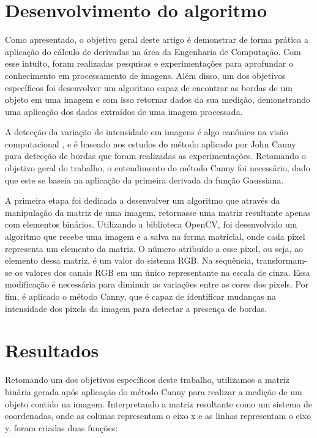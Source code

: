 \documentclass[a4paper,alpha-refs]{RBCA_v1.0}
\begin{document}
\section{Desenvolvimento do algoritmo}

Como apresentado, o objetivo geral deste artigo é demonstrar de forma prática a aplicação do cálculo de derivadas na área da Engenharia de Computação. Com esse intuito, foram realizadas pesquisas e experimentações para aprofundar o conhecimento em processamento de imagens. Além disso, um dos objetivos específicos foi desenvolver um algoritmo capaz de encontrar as bordas de um objeto em uma imagem e com isso retornar dados da sua medição, demonstrando uma aplicação dos dados extraídos de uma imagem processada.

A detecção da variação de intensidade em imagens é algo canônico na visão computacional
\citep{canny1983variational}, e é baseado nos estudos do método aplicado por John Canny para detecção de bordas que foram realizadas as experimentações. Retomando o objetivo geral do trabalho, o entendimento do método Canny foi necessário, dado que este se baseia na aplicação da primeira derivada da função Gaussiana.

A primeira etapa foi dedicada a desenvolver um algoritmo que através da manipulação da matriz de uma imagem, retornasse uma matriz resultante apenas com elementos binários. Utilizando a biblioteca OpenCV, foi desenvolvido um algoritmo que recebe uma imagem e a salva na forma matricial, onde cada pixel representa um elemento da matriz. O número atribuído a esse pixel, ou seja, ao elemento dessa matriz, é um valor do sistema RGB. Na sequência, transformam-se os valores dos canais RGB em um único representante na escala de cinza. Essa modificação é necessária para diminuir as variações entre as cores dos pixels. Por fim, é aplicado o método Canny, que é capaz de identificar mudanças na intensidade dos pixels da imagem para detectar a presença de bordas.

\section{Resultados}

Retomando um dos objetivos específicos deste trabalho, utilizamos a matriz binária gerada após aplicação do método Canny para realizar a medição de um objeto contido na imagem. Interpretando a matriz resultante como um sistema de coordenadas, onde as colunas representam o eixo x e as linhas representam o eixo y, foram criadas duas funções:
\end{document}
